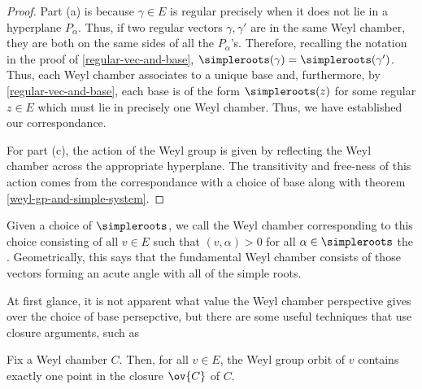 \documentclass[11pt,leqno,oneside]{amsart}
\numberwithin{thm}{section}
\begin{document}
\begin{proof}
  Part (a) is because \(\gamma \in E\) is regular precisely when it
  does not lie in a hyperplane \(P_\alpha\). Thus, if two regular
  vectors \(\gamma, \gamma'\) are in the same Weyl chamber, they are
  both on the same sides of all the \(P_\alpha\)'s. Therefore,
  recalling the notation in the proof of \ref{regular-vec-and-base},
  \(\simpleroots(\gamma) = \simpleroots(\gamma')\). Thus, each Weyl
  chamber associates to a unique base and, furthermore, by
  \ref{regular-vec-and-base}, each base is of the form
  \(\simpleroots(z)\) for some regular \(z \in E\) which must lie in
  precisely one Weyl chamber. Thus, we have established our
  correspondance.

  For part (c), the action of the Weyl group is given by reflecting
  the Weyl chamber across the appropriate hyperplane. The transitivity
  and free-ness
  of this action comes from the correspondance with a choice of base
  along with theorem \ref{weyl-gp-and-simple-system}.
\end{proof}
\begin{defn}
  Given a choice of \(\simpleroots\), we call the Weyl chamber
  corresponding to this choice consisting of all \(v \in E\) such that
  \((v,\alpha) > 0\) for all \(\alpha \in \simpleroots\) the
  .
  Geometrically, this says that the fundamental Weyl chamber consists
  of those vectors forming an acute angle with all of the simple roots.
\end{defn}
At first glance, it is not apparent what value the Weyl chamber
perspective gives over the choice of base persepctive, but there are
some useful techniques that use closure arguments, such as
\begin{thm}\label{weyl-chamber-closure-contains-one-point-in-orbit}
  Fix a Weyl chamber \(C\). Then, for all \(v \in E\), the Weyl group
  orbit of \(v\) contains exactly one point in the closure \(\ov{C}\)
  of \(C\).
\end{thm}
\end{document}
